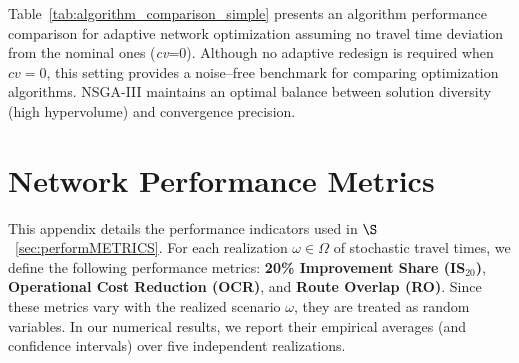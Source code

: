 \documentclass[a4paper,fleqn]{cas-sc}
\begin{document}
Table~\ref{tab:algorithm_comparison_simple} presents an algorithm performance comparison for adaptive network optimization assuming no travel time deviation from the nominal ones (\textit{cv}=0).
Although no adaptive redesign is required when $cv=0$, this setting provides a noise–free benchmark for comparing optimization algorithms.
NSGA-III maintains an optimal balance between solution diversity (high hypervolume) and convergence precision.
%

\section{Network Performance Metrics}\label{A.PerformanceMetrics}

This appendix details the performance indicators used in $\S$~\ref{sec:performMETRICS}.
For each realization $\omega \in \Omega$ of stochastic travel times, we define the following performance metrics: \textbf{20\% Improvement Share (IS$_{20}$)}, \textbf{Operational Cost Reduction (OCR)}, and \textbf{Route Overlap (RO)}. Since these metrics vary with the realized scenario $\omega$, they are treated as random variables. In our numerical results, we report their empirical averages (and confidence intervals) over five independent realizations.
\end{document}
